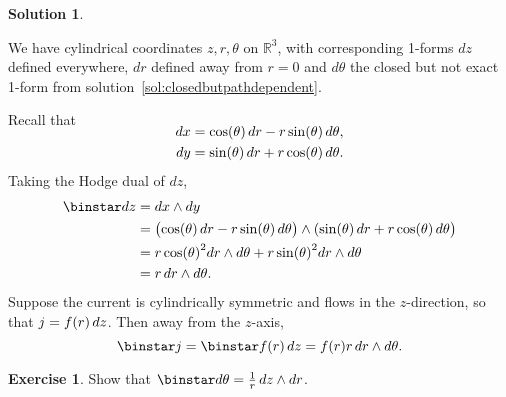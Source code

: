 \documentclass[11pt, a4paper]{report}
\theoremstyle{definition}
\newtheorem{exercise}{Exercise}[part]
\newtheorem{solution}{Solution}[part]
\newenvironment{ex}{\begin{exercise}}{\end{exercise}\pagebreak[1]}
\newenvironment{sol}{\begin{solution}}{\end{solution}\pagebreak[3]}
\newcommand*{\op}[1]{\ensuremath\mathop{}\mathopen{}#1}
\renewcommand*{\d}{\op{d}}
\renewcommand*{\star}{\op{\binstar}\mathord{}}
\begin{document}
\begin{sol}\label{sol:cylindricaldualcurrent}

We have cylindrical coordinates $z, r, \theta$ on $\mathbb{R}^3$, with corresponding 1-forms $dz$ defined everywhere, $dr$ defined away from $r = 0$ and $d\theta$ the closed but not exact 1-form from solution~\ref{sol:closedbutpathdependent}.

Recall that
\begin{align*}
    \SwapAboveDisplaySkip
    dx &= \cos(\theta) \d r - r \sin(\theta) \d \theta, \\
    dy &= \sin(\theta) \d r + r \cos(\theta) \d \theta.
\end{align*}
Taking the Hodge dual of $dz$,
\begin{align*}
    \star dz &= dx \wedge dy \\
             &= \bigl( \cos(\theta) \d r -r \sin(\theta) \d \theta \bigr)
                       \wedge (\sin(\theta) \d r + r \cos(\theta) \d \theta \bigr) \\
             &= r \, {\cos(\theta)}^2 dr \wedge d\theta + r \, {\sin(\theta)}^2 dr \wedge d\theta \\
             &= r \d r \wedge d\theta.
\end{align*}
Suppose the current is cylindrically symmetric and flows in the $z$-direction, so that $j = f(r) \d z$. Then away from the $z$-axis,
\[
    \star j = \star f(r) \d z = f(r) r \d r \wedge d\theta.
\]

\end{sol}

\begin{ex}

Show that $\star d\theta = \frac{1}{r} \d z \wedge dr$.

\end{ex}
\end{document}
